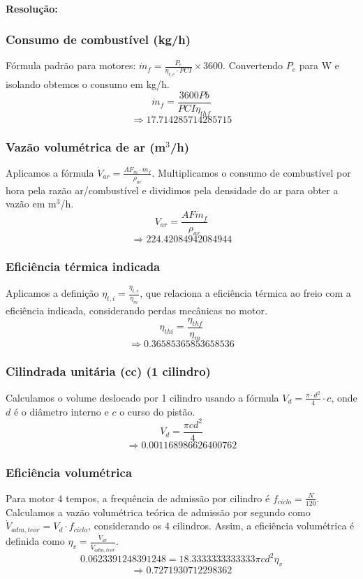 \paragraph{Resolução:}
\begin{enumerate}[leftmargin=*,itemsep=8pt]
\subsubsection*{Consumo de combustível (kg/h)}
\noindent Fórmula padrão para motores: $\dot{{m}}_f = \frac{{P_e}}{\eta_{{t,e}} \cdot PCI} \times 3600$. Convertendo $P_e$ para W e isolando obtemos o consumo em kg/h.
\[\dot{m}_{f} = \frac{3600 Pb}{PCI \eta_{th f}}\]
\[\Rightarrow 17.714285714285715\]
\vspace{{6pt}}
\subsubsection*{Vazão volumétrica de ar (m$^3$/h)}
\noindent Aplicamos a fórmula $\dot{{V}}_{{ar}} = \frac{{AF_m \cdot \dot{{m}}_f}}{\rho_{{ar}}}$. Multiplicamos o consumo de combustível por hora pela razão ar/combustível e dividimos pela densidade do ar para obter a vazão em m$^3$/h.
\[V_{ar} = \frac{AF \dot{m}_{f}}{\rho_{ar}}\]
\[\Rightarrow 224.42084942084944\]
\vspace{{6pt}}
\subsubsection*{Eficiência térmica indicada}
\noindent Aplicamos a definição $\eta_{t,i} = \frac{\eta_{t,e}}{\eta_m}$, que relaciona a eficiência térmica ao freio com a eficiência indicada, considerando perdas mecânicas no motor.
\[\eta_{th i} = \frac{\eta_{th f}}{\eta_{m}}\]
\[\Rightarrow 0.36585365853658536\]
\vspace{{6pt}}
\subsubsection*{Cilindrada unitária (cc) (1 cilindro)}
\noindent Calculamos o volume deslocado por 1 cilindro usando a fórmula $V_d = \frac{\pi \cdot d^2}{4} \cdot c$, onde $d$ é o diâmetro interno e $c$ o curso do pistão.
\[V_{d} = \frac{\pi c d^{2}}{4}\]
\[\Rightarrow 0.001168986626400762\]
\vspace{{6pt}}
\subsubsection*{Eficiência volumétrica}
\noindent Para motor 4 tempos, a frequência de admissão por cilindro é $f_{{ciclo}} = \frac{{N}}{{120}}$. Calculamos a vazão volumétrica teórica de admissão por segundo como $\dot{{V}}_{{adm,teor}} = V_d \cdot f_{{ciclo}}$, considerando os 4 cilindros. Assim, a eficiência volumétrica é definida como $\eta_v = \frac{{\dot{{V}}_{{ar}}}}{{\dot{{V}}_{{adm,teor}}}}$.
\[0.0623391248391248 = 18.3333333333333 \pi c d^{2} \eta_{v}\]
\[\Rightarrow 0.7271930712298362\]
\vspace{{6pt}}

\end{enumerate}
